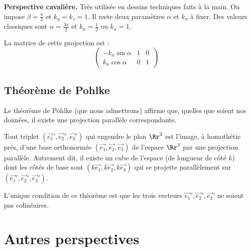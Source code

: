\documentclass[11pt,class=report,crop=false]{standalone}
\begin{document}
\textbf{Perspective cavalière.} Très utilisée en dessins techniques faits à la main.
On impose $\beta=\frac\pi2$ et $k_y=k_z=1$. Il reste deux paramètres $\alpha$ et $k_x$ à fixer. Des valeurs classiques sont $\alpha = \frac{3\pi}{2}$ et $k_x=\frac12$ ou $k_x = 1$.

\begin{center}
\begin{minipage}{0.45\textwidth}
\center
La matrice de cette projection est :
$$\begin{pmatrix}
-k_x \sin\alpha & 1 & 0 \\
k_x \cos\alpha  & 0 & 1 \
\end{pmatrix}$$
\end{minipage}\quad
\begin{minipage}{0.45\textwidth}
\end{minipage}
\end{center}



\subsection{Théorème de Pohlke}


Le théorème de Pohlke (que nous admettrons) affirme que, quelles que soient nos données, il existe une projection parallèle correspondante.

\begin{theoreme}[Pohlke]
Tout triplet $(\vec {e_1}', \vec {e_2}', \vec {e_3}')$ qui engendre le plan $\Rr^2$ est l'image, à homothétie près, d'une base orthonormée $(\vec {e_1},\vec {e_2},\vec {e_3})$ de l'espace $\Rr^3$ par une projection parallèle.
Autrement dit, il existe un cube de l'espace (de longueur de côté $k$) dont les côtés  de base sont $(k\vec {e_1}, k\vec {e_2}, k\vec {e_3})$ qui se projette parallèlement sur $(\vec {e_1}', \vec {e_2}', \vec {e_3}')$.
\end{theoreme}

L'unique condition de ce théorème est que les trois vecteurs $\vec {e_1}',\vec {e_2}',\vec {e_3}'$ ne soient pas colinéaires.


\section{Autres perspectives}
\end{document}
